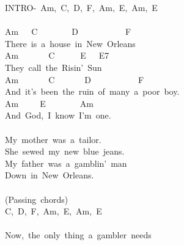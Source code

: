 \documentclass[]{book}
\begin{document}
INTRO-~Am,~C,~D,~F,~Am,~E,~Am,~E\\
~\\
\hspace*{0.333em}\hspace*{0.333em}\hspace*{0.333em}\hspace*{0.333em}\hspace*{0.333em}\hspace*{0.333em}Am~~~C~~~~~~~~D~~~~~~~~~~~F\\
There~is~a~house~in~New~Orleans\\
\hspace*{0.333em}\hspace*{0.333em}\hspace*{0.333em}\hspace*{0.333em}\hspace*{0.333em}Am~~~~~~~C~~~~~~E~~~E7\\
They~call~the~Risin'~Sun\\
\hspace*{0.333em}\hspace*{0.333em}\hspace*{0.333em}\hspace*{0.333em}\hspace*{0.333em}\hspace*{0.333em}\hspace*{0.333em}\hspace*{0.333em}\hspace*{0.333em}Am~~~~~~~C~~~~~~~D~~~~~~~~~~~F\\
And~it's~been~the~ruin~of~many~a~poor~boy.\\
\hspace*{0.333em}\hspace*{0.333em}\hspace*{0.333em}\hspace*{0.333em}Am~~~~~E~~~~~~~~Am\\
And~God,~I~know~I'm~one.\\
~\\
My~mother~was~a~tailor.\\
She~sewed~my~new~blue~jeans.\\
My~father~was~a~gamblin'~man\\
Down~in~New~Orleans.\\
~\\
(Passing~chords)\\
C,~D,~F,~Am,~E,~Am,~E\\
~\\
Now,~the~only~thing~a~gambler~needs\\
\end{document}
